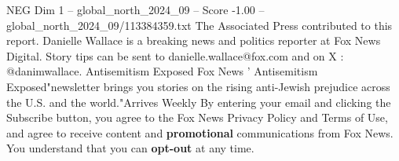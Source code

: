 \begin{textsample}{NEG Dim 1 – global\_north\_2024\_09 – Score -1.00 – global\_north\_2024\_09/113384359.txt}
The Associated Press contributed to this report.
Danielle Wallace is a breaking news and politics reporter at Fox News Digital.
Story tips can be sent to danielle.wallace@fox.com and on X : @danimwallace.
Antisemitism Exposed Fox News ' Antisemitism Exposed"newsletter brings you stories on the rising anti-Jewish prejudice across the U.S. and the world."Arrives Weekly By entering your email and clicking the Subscribe button, you agree to the Fox News Privacy Policy and Terms of Use, and agree to receive content and \textbf{promotional} communications from Fox News.
You understand that you can \textbf{opt-out} at any time.

\end{textsample}
